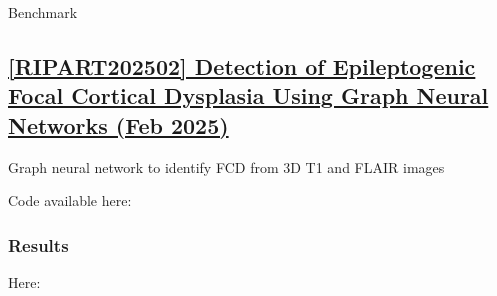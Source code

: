 \begin{table}[htbp]
	\centering
	\caption{Benchmark}

	\caption{Results from }%
	\label{tab:res12}
\end{table}


\newpage
\subsection{\href{https://jamanetwork.com/journals/jamaneurology/article-abstract/2830410}{[RIPART202502] Detection of Epileptogenic Focal Cortical Dysplasia Using Graph Neural Networks (Feb 2025)}}
\label{res13}

Graph neural network to identify FCD from 3D T1 and FLAIR images

Code available here: 

\subsubsection{Results}

Here: 


